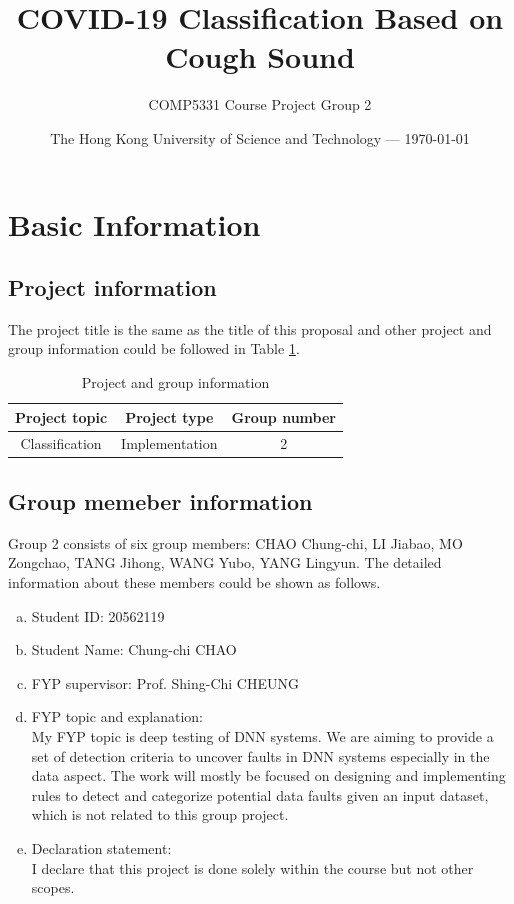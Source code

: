 \documentclass[11pt]{article}
\title{COVID-19 Classification Based on Cough Sound} %
\author{COMP5331 Course Project Group 2 } %
\date{The Hong Kong University of Science and Technology --- \today} %
\begin{document}
\maketitle %


\section{Basic Information} 
\subsection{Project information}
The project title is the same as the title of this proposal and other project and 
group information could be followed in Table \ref{tab1}.
\begin{table}[!htbp]
	\caption{Project and group information} \centering
	\label{tab1}
	\begin{tabular}{ccc}
	\toprule[1.5pt]
	Project topic  & Project type & Group number \\
    \midrule[1pt]
    Classification & Implementation & 2 \\
	\bottomrule[1.5pt]
	\end{tabular}
\end{table}

\subsection{Group memeber information}
Group 2 consists of  six group members: CHAO Chung-chi, LI Jiabao, MO Zongchao, TANG Jihong, 
WANG Yubo, YANG Lingyun. The detailed information about these members could be shown as 
follows. 

\begin{member}
	\begin{enumerate}[(a)]
		\item Student ID: 20562119
		\item Student Name: Chung-chi CHAO
		\item FYP supervisor: Prof. Shing-Chi CHEUNG
		\item FYP topic and explanation: \\
		My FYP topic is deep testing of DNN systems. We are aiming to provide a set of detection criteria to uncover faults in DNN systems especially in the data aspect. The work will mostly be focused on designing and implementing rules to detect and categorize potential data faults given an input dataset, which is not related to this group project.
		\item Declaration statement: \\
		I declare that this project is done solely within the course but not other scopes.
	\end{enumerate}
\end{member}
\end{document}
